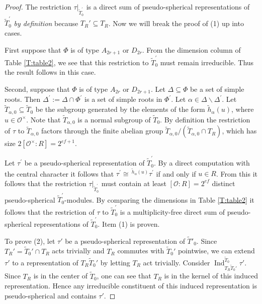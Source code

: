 \documentclass[10pt, letterpaper]{amsart}
\theoremstyle{plain}
\theoremstyle{definition}
\numberwithin{equation}{section}
\newcommand{\htt}{\tilde{h}}
\newcommand{\Tt}{\widetilde{T}}
\newcommand{\Ind}{\operatorname{Ind}}
\newcommand{\Ocal}{\mathcal{O}}
\begin{document}
\begin{proof}
	The restriction $\tau|_{\Tt_0^{\prime}}$ is a direct sum of pseudo-spherical representations of $\Tt_{0}^{\prime}$ {\it by definition} because $T_R'\subseteq T_R$. Now we will break the proof of (1) up into cases.
	
	First suppose that $\Phi$ is of type $A_{2r+1}$ or $D_{2r}$. From the dimension column of Table \ref{T:table2}, we see that this restriction to $\Tt_{0}^{\prime}$ must remain irreducible. Thus the result follows in this case.
	
	Second, suppose that $\Phi$ is of type $A_{2r}$ or $D_{2r+1}$. Let $\Delta\subseteq\Phi$ be a set of simple roots. Then $\Delta^{\prime}:=\Delta\cap\Phi^{\prime}$ is a set of simple roots in $\Phi^{\prime}$. Let $\alpha\in \Delta\smallsetminus\Delta^{\prime}$. Let $\Tt_{\alpha,0}\subseteq \Tt_{0}$ be the subgroup generated by the elements of the form $\htt_{\alpha}(u)$, where $u\in \Ocal^{\times}$. Note that $\Tt_{\alpha,0}$ is a normal subgroup of $\Tt_{0}$. By definition the restriction of $\tau$ to $\Tt_{\alpha,0}$ factors through the finite abelian group $\Tt_{\alpha,0}/(\Tt_{\alpha,0}\cap T_R)$, which has size $2[\Ocal^{\times}:R]=2^{ef+1}$.
	
	Let $\tau^{\prime}$ be a pseudo-spherical representation of $\Tt_{0}^{\prime}$. By a direct computation with the central character it follows that $\tau^{\prime}\cong \,^{\htt_{\alpha}(u)}\tau^{\prime}$ if and only if $u\in R$. From this it follows that the restriction $\tau|_{\Tt_{0}^{\prime}}$ must contain at least $[\Ocal:R]=2^{ef}$ distinct pseudo-spherical $\Tt_{0}^{\prime}$-modules. By comparing the dimensions in Table \ref{T:table2} it follows that the restriction of $\tau$ to $\Tt_{0}^{\prime}$ is a multiplicity-free direct sum of pseudo-spherical representations of $\Tt_{0}^{\prime}$.
    Item (1) is proven. 
    
    To prove (2), let $\tau'$ be a pseudo-spherical representation of $\Tt'_0$. Since $T_R'=\Tt_0'\cap T_R$ acts trivially and $T_R$ commutes with $\Tt_0'$ pointwise, we can extend $\tau'$ to a representation of $T_R\Tt_0'$ by letting $T_R$ act trivially. Consider $\Ind_{T_R\Tt_0'}^{\Tt_0}\tau'$. Since $T_R$ is in the center of $\Tt_0$, one can see that $T_R$ is in the kernel of this induced representation. Hence any irreducible constituent of this induced representation is pseudo-spherical and contains $\tau'$.
\end{proof}

\end{document}
